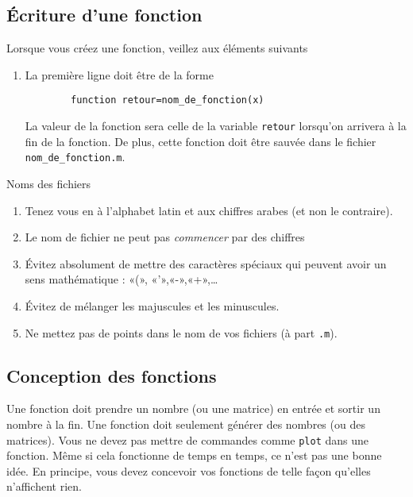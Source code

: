 \subsection{Écriture d'une fonction}

Lorsque vous créez une fonction, veillez aux éléments suivants
\begin{enumerate}

	\item
		La première ligne doit être de la forme
		\begin{verbatim}
		function retour=nom_de_fonction(x)
		\end{verbatim}
		La valeur de la fonction sera celle de la variable \verb+retour+ lorsqu'on arrivera à la fin de la fonction. De plus, cette fonction doit être sauvée dans le fichier \verb+nom_de_fonction.m+.

\end{enumerate}

Noms des fichiers
\begin{enumerate}
	\item
		Tenez vous en à l'alphabet latin et aux chiffres arabes (et non le contraire).
	\item
		Le nom de fichier ne peut pas \emph{commencer} par des chiffres
	\item
		Évitez absolument de mettre des caractères spéciaux qui peuvent avoir un sens mathématique : «(», «'»,«-»,«+»,\ldots
	\item
		Évitez de mélanger les majuscules et les minuscules. %
	\item
		Ne mettez pas de points dans le nom de vos fichiers (à part \verb+.m+).
\end{enumerate}

\subsection{Conception des fonctions}

Une fonction doit prendre un nombre (ou une matrice) en entrée et sortir un nombre à la fin. Une fonction doit seulement générer des nombres (ou des matrices). Vous ne devez pas mettre de commandes comme \verb+plot+ dans une fonction. Même si cela fonctionne de temps en temps, ce n'est pas une bonne idée. En principe, vous devez concevoir vos fonctions de telle façon qu'elles n'affichent rien.

